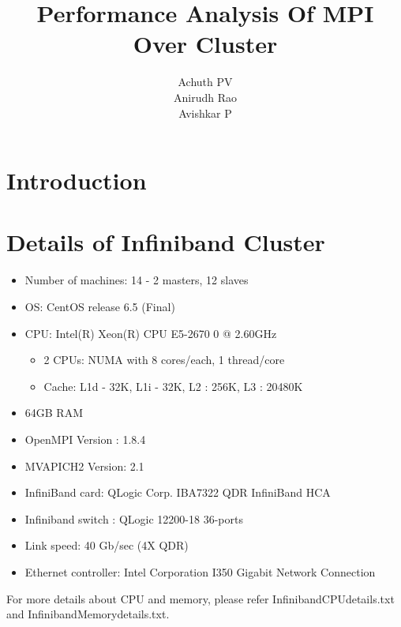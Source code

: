 \documentclass[10pt]{article}
\title{\textbf{Performance Analysis Of MPI Over Cluster}}
\author{Achuth PV\\
		Anirudh Rao\\
		Avishkar P}
\date{}
\begin{document}
\maketitle

\section{Introduction}

\section{Details of Infiniband Cluster}
\begin{itemize}
\item Number of machines: 14 -  2 masters, 12 slaves
\item OS: CentOS release 6.5 (Final)
\item CPU: Intel(R) Xeon(R) CPU E5-2670 0 @ 2.60GHz
\begin{itemize}
\item 2 CPUs: NUMA with 8 cores/each, 1 thread/core
\item Cache: L1d - 32K, L1i - 32K, L2 : 256K, L3 : 20480K
\end{itemize}
\item 64GB RAM
\item OpenMPI Version : 1.8.4
\item MVAPICH2 Version: 2.1
\item InfiniBand card: QLogic Corp. IBA7322 QDR InfiniBand HCA
\item Infiniband switch : QLogic 12200-18 36-ports
\item Link speed: 40 Gb/sec (4X QDR)
\item Ethernet controller: Intel Corporation I350 Gigabit Network Connection
\end{itemize}
For more details about CPU and memory, please refer Infiniband\textunderscore CPU\textunderscore details.txt and Infiniband\textunderscore Memory\textunderscore details.txt.
\end{document}
